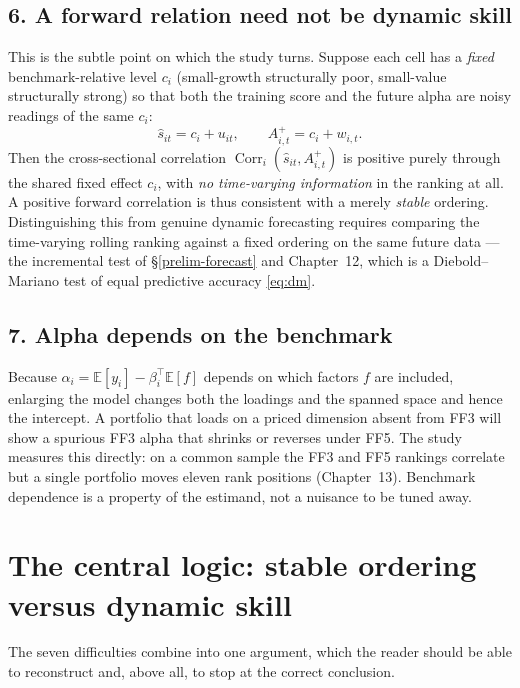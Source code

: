 \subsection{6. A forward relation need not be dynamic skill}

This is the subtle point on which the study turns. Suppose each cell has a
\emph{fixed} benchmark-relative level $c_i$ (small-growth structurally
poor, small-value structurally strong) so that both the training score and
the future alpha are noisy readings of the same $c_i$:
\begin{equation}
\hat s_{it}=c_i+u_{it},\qquad A^{+}_{i,t}=c_i+w_{i,t}.
\end{equation}
Then the cross-sectional correlation $\operatorname{Corr}_i(\hat s_{it},
A^{+}_{i,t})$ is positive purely through the shared fixed effect $c_i$,
with \emph{no time-varying information} in the ranking at all. A positive
forward correlation is thus consistent with a merely \emph{stable}
ordering. Distinguishing this from genuine dynamic forecasting requires
comparing the time-varying rolling ranking against a fixed ordering on the
same future data --- the incremental test of \S\ref{prelim-forecast} and
Chapter~12, which is a Diebold--Mariano test of equal predictive accuracy
\eqref{eq:dm}.

\subsection{7. Alpha depends on the benchmark}

Because $\alpha_i=\mathbb{E}[y_i]-\beta_i^{\top}\mathbb{E}[f]$ depends on
which factors $f$ are included, enlarging the model changes both the
loadings and the spanned space and hence the intercept. A portfolio that
loads on a priced dimension absent from FF3 will show a spurious FF3 alpha
that shrinks or reverses under FF5. The study measures this directly: on a
common sample the FF3 and FF5 rankings correlate but a single portfolio
moves eleven rank positions (Chapter~13). Benchmark dependence is a
property of the estimand, not a nuisance to be tuned away.

\section{The central logic: stable ordering versus dynamic skill}\label{rq-logic}

The seven difficulties combine into one argument, which the reader should
be able to reconstruct and, above all, to stop at the correct conclusion.

